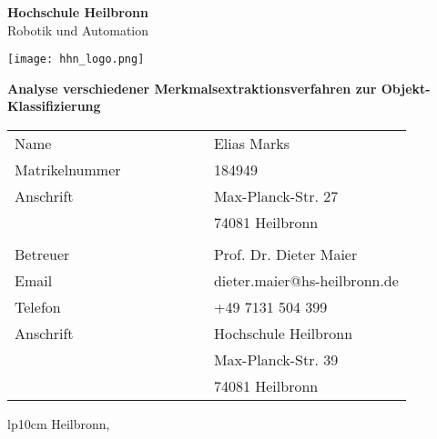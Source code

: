 
\begin{titlepage}
\large
\begin{center}
{\bf Hochschule Heilbronn}\\
Robotik und Automation\\
\end{center}

\hspace{0.2cm}

\begin{minipage}{\textwidth}
\begin{center}
\texttt{[image: hhn\_logo.png]}

\end{center}
\end{minipage}

\begin{center}
\vspace{0.8cm}
{\Large\bfseries Analyse verschiedener Merkmalsextraktionsverfahren zur Objekt-Klassifizierung\\}
\vspace{0.8cm}
\end{center}

\begin{table}[ht]
\begin{tabular*}{\linewidth}{p{0.5\linewidth} p{0.5\linewidth}}
Name & Elias Marks\\
Matrikelnummer & 184949\\
Anschrift & Max-Planck-Str. 27\\
& 74081 Heilbronn \\
&\\
Betreuer & Prof. Dr. Dieter Maier\\
Email & dieter.maier@hs-heilbronn.de\\
Telefon & +49 7131 504 399\\
Anschrift & Hochschule Heilbronn\\
& Max-Planck-Str. 39\\
& 74081 Heilbronn \\

\end{tabular*}
\end{table}


\vspace{1.0cm}
\begin{sloppy}
\begin{tabular}{lp{10cm}}
{Heilbronn, \finishdate \hspace{5.5cm} \dotfill}\\
{\hspace{8,5cm} \myName} \\
\end{tabular}
\end{sloppy}
\end{titlepage}
